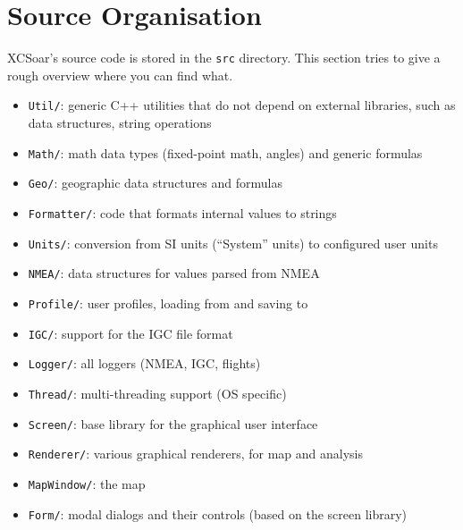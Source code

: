 \documentclass[a4paper,12pt]{refrep}
\begin{document}
\section{Source Organisation}

XCSoar's source code is stored in the \texttt{src} directory.  This
section tries to give a rough overview where you can find what.

\begin{itemize}

\item \texttt{Util/}: generic C++ utilities that do not depend on
  external libraries, such as data structures, string operations

\item \texttt{Math/}: math data types (fixed-point math, angles) and
  generic formulas

\item \texttt{Geo/}: geographic data structures and formulas

\item \texttt{Formatter/}: code that formats internal values to
  strings

\item \texttt{Units/}: conversion from SI units (``System'' units) to
  configured user units

\item \texttt{NMEA/}: data structures for values parsed from NMEA

\item \texttt{Profile/}: user profiles, loading from and saving to

\item \texttt{IGC/}: support for the IGC file format

\item \texttt{Logger/}: all loggers (NMEA, IGC, flights)

\item \texttt{Thread/}: multi-threading support (OS specific)

\item \texttt{Screen/}: base library for the graphical user interface

\item \texttt{Renderer/}: various graphical renderers, for map and
  analysis

\item \texttt{MapWindow/}: the map

\item \texttt{Form/}: modal dialogs and their controls (based on the
  screen library)


\end{itemize}
\end{document}
